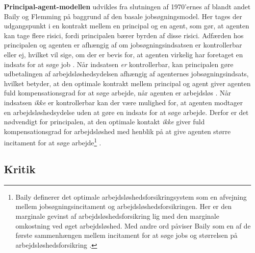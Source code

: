\textbf{Principal-agent-modellen} udvikles fra slutningen af 1970'ernes af blandt andet Baily og Flemming på baggrund af den basale jobsøgningsmodel. Her tages der udgangspunkt i en kontrakt mellem en principal og en agent, som gør, at agenten kan tage flere risici, fordi principalen bærer byrden af disse risici. Adfærden hos principalen og agenten er afhængig af om jobsøgningsindsatsen er kontrollerbar eller ej, hvilket vil sige, om der er bevis for, at agenten virkelig har foretaget en indsats for at søge job \parencite[134]{Cahuc2004}. Når indsatsen \textit{er} kontrollerbar, kan principalen gøre udbetalingen af arbejdsløshedsydelsen afhængig af agenternes jobsøgningsindsats, hvilket betyder, at den optimale kontrakt mellem principal og agent giver agenten fuld kompensationsgrad for at søge arbejde, når agenten er arbejdsløs \parencite[138]{Cahuc2004}. Når indsatsen \textit{ikke} er kontrollerbar kan der være mulighed for, at agenten modtager en arbejdsløshedsydelse uden at gøre en indsats for at søge arbejde. Derfor er det nødvendigt for principalen, at den optimale kontakt \textit{ikke} giver fuld kompensationsgrad for arbejdsløshed med henblik på at give agenten større incitament for at søge arbejde\footnote{Baily definerer det optimale arbejdsløshedsforsikringsystem som en afvejning mellem jobsøgningsincitament og arbejdsløshedsforsikringen. Her er den marginale gevinst af arbejdsløshedsforsikring lig med den marginale omkostning ved øget arbejdsløshed. Med andre ord påviser Baily som en af de første sammenhængen mellem incitament for at søge jobs og størrelsen på arbejdsløshedsforsikring \parencite[379]{Baily1978}.} \parencite[379]{Baily1978}. %


\subsection{Kritik}

